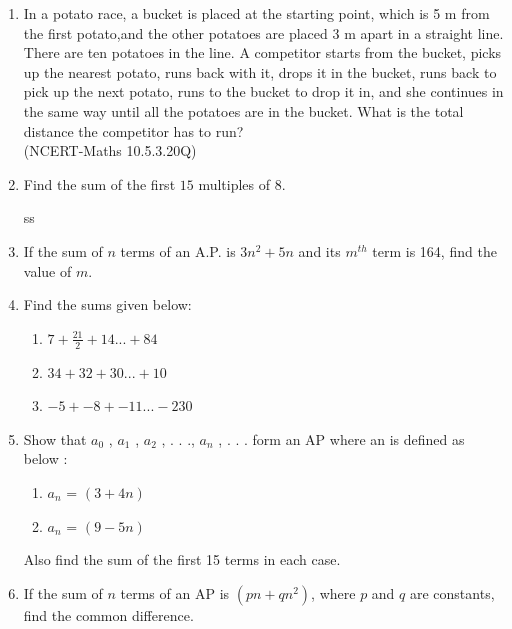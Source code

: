 \begin{enumerate}[label=\thechapter.\arabic*,ref=\thechapter.\theenumi]

\item In a potato race, a bucket is placed at the starting point, which is 5 m from the first potato,and the other potatoes are placed 3 m apart in a straight line. There are ten potatoes in the line. A competitor starts from the bucket, picks up the nearest potato, runs back with it, drops it in the bucket, runs back to pick up the next potato, runs to the bucket to drop it in, and she continues in the same way until all the potatoes are in the bucket. What is the total distance the competitor has to run?\\
\hfill(NCERT-Maths 10.5.3.20Q)\\
\solution 

\pagebreak

\item Find the sum of the first $15$ multiples of $8$. \\

\solution

ss\pagebreak

\item If the sum of $n$ terms of an A.P. is $3n^2+5n$ and its $m^{th}$ term is 164, find the value of $m$.\\
\solution


\pagebreak
\item Find the sums given below:
\begin{enumerate}
    \item  $7 + \frac{21}{2} + 14 ... + 84$
    \item  $34 + 32 + 30 ... + 10$
    \item  $-5 + -8 + -11 ... -230$
\end{enumerate}
\solution

\pagebreak
\item Show that $a_0$ , $a_1$ , $a_2$
, . . ., $a_n$
, . . . form an AP where an is defined as below :
\begin{enumerate}
    \item $a_n$ = $(3 + 4n)$ 
    \item $a_n$ = $(9 - 5n)$ 
\end{enumerate}
Also find the sum of the first 15 terms in each case.
\solution


\pagebreak
\item If the sum of $n$ terms of an AP is $(pn + qn^2)$, where $p$ and $q$ are constants, find the common difference.
\solution
		


\end{enumerate}
